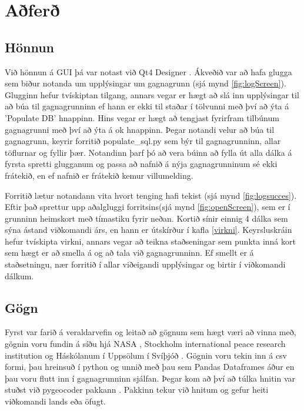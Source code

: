 \documentclass[12pt, git, final]{rureport}
\begin{document}



\section{Aðferð}
\subsection{Hönnun}
Við hönnun á GUI þá var notast við Qt4 Designer \cite{qt4}. Ákveðið var að hafa glugga sem biður notanda um upplýsingar um gagnagrunn (sjá mynd \ref{fig:logScreen}). Glugginn hefur tvískiptan tilgang, annars vegar er hægt að slá inn upplýsingar til að búa til gagnagrunninn ef hann er ekki til staðar í tölvunni með því að ýta á 'Populate DB' hnappinn. Hins vegar er hægt að tengjast fyrirfram tilbúnum gagnagrunni með því að ýta á ok hnappinn. Þegar notandi velur að búa til gagnagrunn, keyrir forritið populate\_sql.py sem býr til gagnagrunninn, allar töflurnar og fyllir þær. Notandinn þarf þó að vera búinn að fylla út alla dálka á fyrsta spretti glugganum og passa að nafnið á nýja gagnagrunninum sé ekki frátekið, en ef nafnið er frátekið kemur villumelding.

Forritið lætur notandann vita hvort tenging hafi tekist (sjá mynd \ref{fig:logsucces}). Eftir það sprettur upp aðalgluggi forritsins(sjá mynd \ref{fig:openScreen}), sem er í grunninn heimskort með tímastiku fyrir neðan. Kortið sínir einnig 4 dálka sem sýna ástand viðkomandi árs, en hann er útskírður  í kafla \ref{virkni}. Keyrsluskráin hefur tvískipta virkni, annars vegar að teikna staðseningar sem punkta inná kort sem hægt er að smella á og að tala við gagnagrunninn. Ef smellt er á staðsetningu, nær forritið í allar viðeigandi upplýsingar og birtir í viðkomandi dálkum.
 

\subsection{Gögn}
Fyrst var farið á veraldarvefin og leitað að gögnum sem hægt væri að vinna með, gögnin voru fundin á síðu hjá NASA \cite{Eclipse}, Stockholm international peace research institution \cite{weapon} og Háskólanum í Uppsölum í Svíþjóð \cite{conflict}. Gögnin voru tekin inn á csv formi, þau hreinsuð í python og unnið með þau sem Pandas Dataframes áður en þau voru flutt inn í gagnagrunninn sjálfan. Þegar kom að því að túlka hnitin var stuðst við pygeocoder pakkann \cite{geocoder}. Pakkinn tekur við hnitum og gefur heiti viðkomandi lands eða öfugt.
\end{document}
